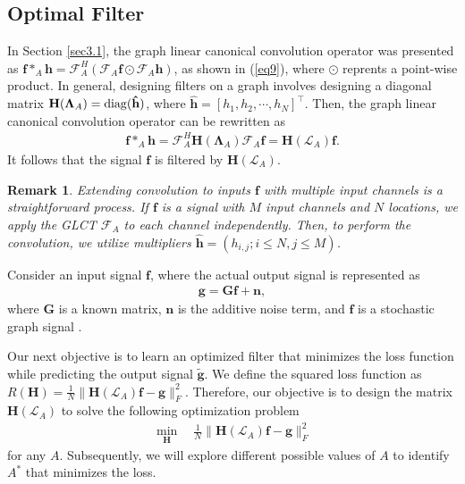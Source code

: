 \documentclass[lettersize,journal]{IEEEtran}
\newtheorem{remark}{Remark}
\begin{document}
\subsection{Optimal Filter}
In Section \ref{sec3.1}, the graph linear canonical convolution operator was presented as $\mathbf{f} *_A \mathbf{h}= \mathcal{F}_{A}^H \left( \mathcal{F}_{A}\mathbf{f} \odot \mathcal{F}_{A}\mathbf{h} \right)$, as shown in (\ref{eq9}), where $\odot$ reprents a point-wise product.
In general, designing filters on a graph involves designing a diagonal matrix $\mathbf{H}(\boldsymbol{\Lambda}_A)={\rm diag}(\mathbf{\hat{h}})$, where $\mathbf{\hat{h}}=[h_1,h_2,\cdots,h_N]^{\top}$. Then, the graph linear canonical convolution operator can be rewritten as
\begin{align}
	\mathbf{f} *_A \mathbf{h}= \mathcal{F}_{A}^H \mathbf{H}(\boldsymbol{\Lambda}_A) \mathcal{F}_{A}\mathbf{f} =\mathbf{H}(\mathcal{L}_{A}) \mathbf{f}.
\end{align}
It follows that the signal $\mathbf{f}$ is filtered by $\mathbf{H}(\mathcal{L}_{A})$.

\begin{remark}
	Extending convolution to inputs $\mathbf{f}$ with multiple input channels is a straightforward process. If $\mathbf{f}$ is a signal with $M$ input channels and $N$ locations, we apply the GLCT $\mathcal{F}_{A}$ to each channel independently. Then, to perform the convolution, we utilize multipliers $\mathbf{\hat{h}} = (h_{i,j} ; i \leq N , j \leq M)$.
\end{remark}

Consider an input signal $\mathbf{f}$, where the actual output signal is represented as
\begin{align}
	\mathbf{g}=\mathbf{Gf}+\mathbf{n},
\end{align}
where $\mathbf{G}$ is a known matrix, $\mathbf{n}$ is the additive noise term, and $\mathbf{f}$ is a stochastic graph signal \cite{ozturk2021optimal}.

Our next objective is to learn an optimized filter that minimizes the loss function while predicting the output signal $\widetilde{\mathbf{g}}$. We define the squared loss function as
$R(\mathbf{H}) = \frac{1}{N} \|\mathbf{H}(\mathcal{L}_{A}) \mathbf{f} - \mathbf{g}\|_F^2$.
Therefore, our objective is to design the matrix $\mathbf{H}(\mathcal{L}_{A})$ to solve the following optimization problem
\begin{align} \label{eq10}
	\min_{\mathbf{H}}
	\quad
	\frac{1}{N} \|\mathbf{H}(\mathcal{L}_{A}) \mathbf{f} - \mathbf{g}\|_F^2
\end{align}
for any $A$. Subsequently, we will explore different possible values of $A$ to identify $A^*$ that minimizes the loss.
\end{document}
